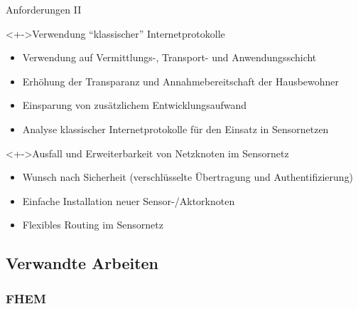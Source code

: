 \begin{frame}{\insertsection}{Anforderungen II}
	\begin{block}<+->{Verwendung \enquote{klassischer} Internetprotokolle}
		\begin{itemize}
		\item 	Verwendung auf Vermittlungs-, Transport- und Anwendungsschicht
		\item 	Erhöhung der Transparanz und Annahmebereitschaft der Hausbewohner
		\item 	Einsparung von zusätzlichem Entwicklungsaufwand
		\item 	Analyse klassischer Internetprotokolle\newline
				für den Einsatz in Sensornetzen
		\end{itemize}
	\end{block}
	\vfill
	\begin{block}<+->{Ausfall und Erweiterbarkeit von Netzknoten im Sensornetz}
		\begin{itemize}
		\item 	Wunsch nach Sicherheit (verschlüsselte Übertragung und Authentifizierung)
		\item 	Einfache Installation neuer Sensor-/Aktorknoten
		\item 	Flexibles Routing im Sensornetz
		\end{itemize}
	\end{block}
\end{frame}


\subsection{Verwandte Arbeiten}


	\subsubsection{FHEM}


